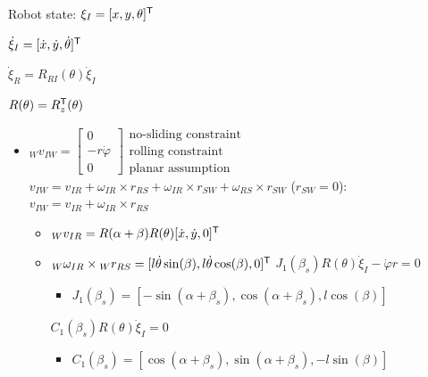 \begin{itemize*}
    \item Robot state: $\xi_I = [x, y, \theta]^{\mathsf{T}}$ 
    \item $\dot \xi_I = [\dot x, \dot y, \dot \theta]^{\mathsf{T}}$ 
    \item $\dot \xi_R = R_{RI}(\theta) \dot \xi_I$
    \item $R(\theta) = R^{\mathsf{T}}_z(\theta)$
\end{itemize*}
\begin{itemize}
    \item ${}_W v_{IW} = 
        \begin{bmatrix}
            0\\
            -r \dot \varphi\\
            0
        \end{bmatrix}
        \begin{matrix}
            \text{no-sliding constraint}\\
            \text{rolling constraint}\\
            \text{planar assumption}
        \end{matrix}$
     $v_{IW} = v_{IR} + \omega_{IR} \times r_{RS} + \omega_{IR} \times r_{SW} + \omega_{RS} \times r_{SW}$
     ($r_{SW} = 0$): $v_{IW} = v_{IR} + \omega_{IR} \times r_{RS}$
        \begin{itemize}
            \item ${}_W v_{IR} = R(\alpha + \beta) R(\theta)[\dot x, \dot y, 0]^{\mathsf{T}}$
            \item ${}_W \omega_{IR} \times {}_W r_{RS} = [l \dot \theta \sin(\beta), l \dot \theta \cos(\beta), 0]^{\mathsf{T}}$
             $J_1(\beta_s) R(\theta) \dot \xi_I - \dot \varphi r = 0$ 
                \begin{itemize}
                    \item  $J_1(\beta_s) = [-\sin(\alpha + \beta_s), \cos(\alpha + \beta_s), l \cos(\beta)]$
                \end{itemize}
             $C_1(\beta_s) R(\theta) \dot \xi_I = 0$
                \begin{itemize}
                    \item $C_1(\beta_s) = [\cos(\alpha + \beta_s), \sin(\alpha + \beta_s), -l \sin(\beta)]$
                \end{itemize}
        \end{itemize}

\end{itemize}
